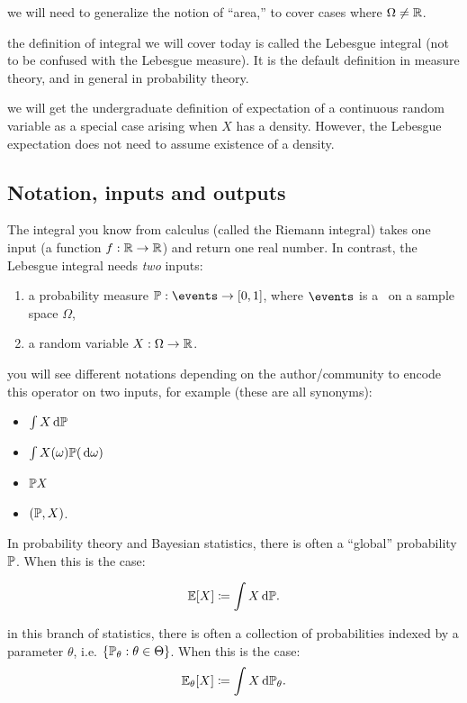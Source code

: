 \documentclass{article}
\begin{document}
 we will need to generalize the notion of ``area,'' to cover cases where $\Omega \neq \R$.

 the definition of integral we will cover today is called the Lebesgue integral (not to be confused with the Lebesgue measure). It is the default definition in measure theory, and in general in probability theory.

 we will get the undergraduate definition of expectation of a continuous random variable as a special case arising when $X$ has a density. However, the Lebesgue expectation does not need to assume existence of a density.


\subsection{Notation, inputs and outputs}

The integral you know from calculus (called the Riemann integral) takes one input (a function $f : \R \to \R$) and return one real number. In contrast, the Lebesgue integral needs \emph{two} inputs:
\begin{enumerate}
  \item a probability measure $\P : \events \to [0, 1]$, where $\events$ is a \sigmaalg\ on a sample space $\Omega$,
  \item a random variable $X : \Omega \to \R$.
\end{enumerate}

 you will see different notations depending on the author/community to encode this operator on two inputs, for example (these are all synonyms):
\begin{itemize}
  \item $\int X \ud \P$
  \item $\int X(\omega) \P(\ud \omega)$
  \item $\P X$
  \item $(\P, X)$.
\end{itemize}

In probability theory and Bayesian statistics, there is often a ``global'' probability $\P$. When this is the case:

\[ \E[X] \defeq \int X \ud \P. \]



 in this branch of statistics, there is often a collection of probabilities indexed by a parameter $\theta$, i.e. $\{\P_\theta : \theta \in \Theta\}$. When this is the case:
\[ \E_\theta[X] \defeq \int X \ud \P_\theta. \]
\end{document}
